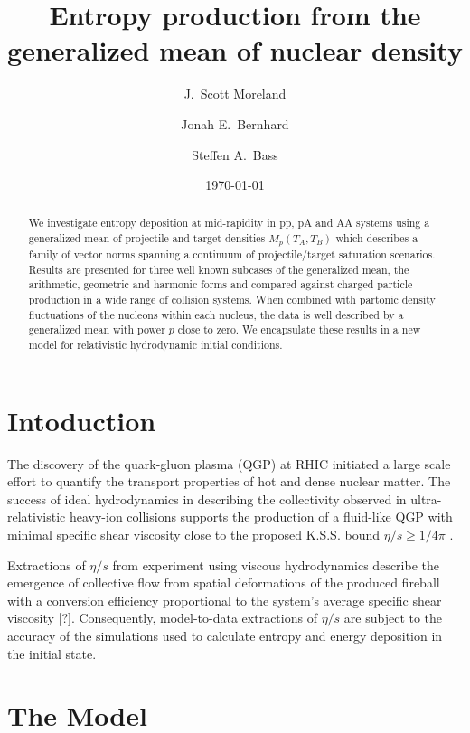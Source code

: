 \documentclass[aps,prl,reprint,amsmath,nofootinbib]{revtex4-1}
\begin{document}
\title{Entropy production from the generalized mean of nuclear density}

\author{J.\ Scott Moreland}
\author{Jonah E.\ Bernhard}
\author{Steffen A.\ Bass}

\date{\today}


\begin{abstract}
   We investigate entropy deposition at mid-rapidity in pp, pA and AA systems using a generalized mean of projectile and target 
densities $M_p(T_A,T_B)$ which describes a family of vector norms spanning a continuum of projectile/target saturation scenarios. 
Results are presented for three well known subcases of the generalized mean, the arithmetic, geometric and harmonic forms and 
compared against charged particle production in a wide range of collision systems. When combined with partonic density fluctuations of 
the nucleons within each nucleus, the data is well described by a generalized mean with power $p$ close to zero. We encapsulate 
these results in a new model for relativistic hydrodynamic initial conditions.
\end{abstract}

\maketitle

\section{Intoduction}

The discovery of the quark-gluon plasma (QGP) at RHIC initiated a large scale effort to quantify the transport properties of 
hot and dense nuclear matter. The success of ideal hydrodynamics in describing the collectivity observed in ultra-relativistic 
heavy-ion collisions supports the production of a fluid-like QGP with minimal specific shear viscosity close to the proposed 
K.S.S. bound $\eta/s \ge 1/4\pi$ \cite{KSS}. 

Extractions of $\eta/s$ from experiment using viscous hydrodynamics describe the emergence of collective flow from spatial 
deformations of the produced fireball with a conversion efficiency proportional to the system's average specific shear viscosity [?]. 
Consequently, model-to-data extractions of $\eta/s$ are subject to the accuracy of the simulations used to calculate entropy and 
energy deposition in the initial state.

\section{The Model}
\end{document}
